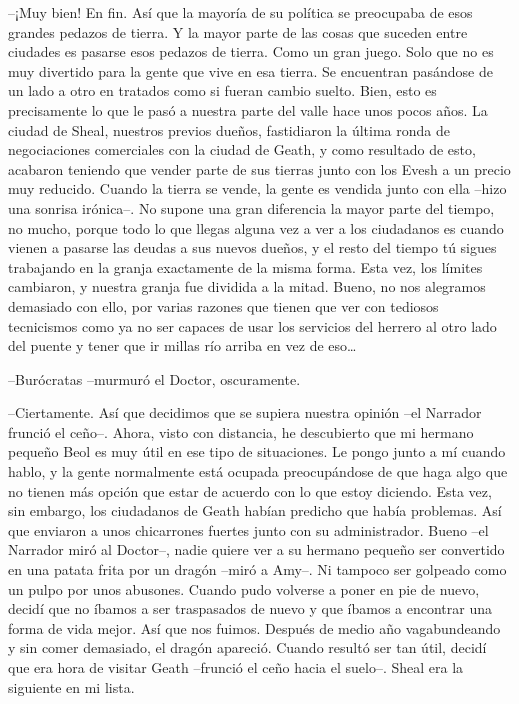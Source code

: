 {--¡Muy bien! En fin. Así que la mayoría de su política se preocupaba
	de esos grandes pedazos de tierra. Y la mayor parte de las cosas que
	suceden entre ciudades es pasarse esos pedazos de tierra. Como un gran
	juego. Solo que no es muy divertido para la gente que vive en esa
	tierra. Se encuentran pasándose de un lado a otro en tratados como si
	fueran cambio suelto. Bien, esto es precisamente lo que le pasó a
	nuestra parte del valle hace unos pocos años. La ciudad de Sheal,
	nuestros previos dueños, fastidiaron la última ronda de negociaciones
	comerciales con la ciudad de Geath, y como resultado de esto, acabaron
	teniendo que vender parte de sus tierras junto con los Evesh a un precio
	muy reducido. Cuando la tierra se vende, la gente es vendida junto con
	ella --hizo una sonrisa irónica--. No supone una gran diferencia la
	mayor parte del tiempo, no mucho, porque todo lo que llegas alguna vez a
	ver a los ciudadanos es cuando vienen a pasarse las deudas a sus nuevos
	dueños, y el resto del tiempo tú sigues trabajando en la granja
	exactamente de la misma forma. Esta vez, los límites cambiaron, y
	nuestra granja fue dividida a la mitad. Bueno, no nos alegramos
	demasiado con ello, por varias razones que tienen que ver con tediosos
	tecnicismos como ya no ser capaces de usar los servicios del herrero al
	otro lado del puente y tener que ir millas río arriba en vez de
	eso\ldots{}}

{--Burócratas --murmuró el Doctor, oscuramente.}

{--Ciertamente. Así que decidimos que se supiera nuestra opinión --el
	Narrador frunció el ceño--. Ahora, visto con distancia, he descubierto
	que mi hermano pequeño Beol es muy útil en ese tipo de situaciones. Le
	pongo junto a mí cuando hablo, y la gente normalmente está ocupada
	preocupándose de que haga algo que no tienen más opción que estar de
	acuerdo con lo que estoy diciendo. Esta vez, sin embargo, los ciudadanos
	de Geath habían predicho que había problemas. Así que enviaron a unos
	chicarrones fuertes junto con su administrador. Bueno --el Narrador miró
	al Doctor--, nadie quiere ver a su hermano pequeño ser convertido en una
	patata frita por un dragón --miró a Amy--. Ni tampoco ser golpeado como
	un pulpo por unos abusones. Cuando pudo volverse a poner en pie de
	nuevo, decidí que no íbamos a ser traspasados de nuevo y que íbamos a
	encontrar una forma de vida mejor. Así que nos fuimos. Después de medio
	año vagabundeando y sin comer demasiado, el dragón apareció. Cuando
	resultó ser tan útil, decidí que era hora de visitar Geath --frunció el
ceño hacia el suelo--. Sheal era la siguiente en mi lista.}

